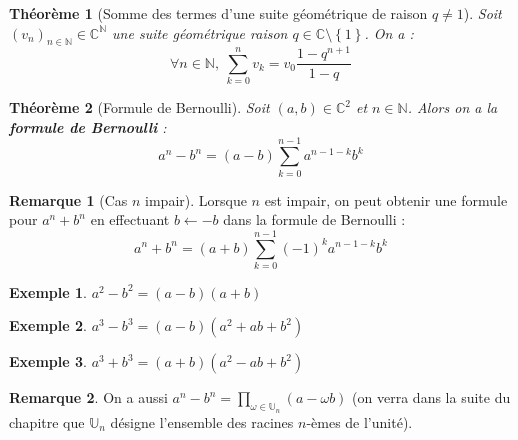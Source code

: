 \documentclass[french]{book}
\newcommand{\N}{\mathbb{N}}
\newcommand{\C}{\mathbb{C}}
\newcommand{\U}{\mathbb{U}}
\theoremstyle{plain}
\newtheorem{thm}{Théorème}[chapter]
\theoremstyle{definition}
\newtheorem{exa}{Exemple}[chapter]
\newtheorem{rmq}{Remarque}[chapter]
\theoremstyle{remark}
\begin{document}
\begin{thm}[Somme des termes d'une suite géométrique de raison $q\ne1$]
	Soit $(v_n)_{n\in\N}\in\C^\N$ une suite géométrique raison $q\in\C\setminus\left\{1\right\}$. On a : $$\forall n\in\N,\ \sum_{k=0}^{n}v_k=v_0\frac{1-q^{n+1}}{1-q}$$
\end{thm}
\begin{thm}[Formule de Bernoulli]
	Soit $(a,b)\in\C^2$ et $n\in\N$. Alors on a la \textbf{formule de Bernoulli} : $$a^n-b^n=(a-b)\sum_{k=0}^{n-1}a^{n-1-k}b^k$$
\end{thm}
\begin{rmq}[Cas $n$ impair]
	Lorsque $n$ est impair, on peut obtenir une formule pour $a^n+b^n$ en effectuant $b\leftarrow -b$ dans la formule de Bernoulli : $$a^n+b^n=(a+b)\sum_{k=0}^{n-1}(-1)^ka^{n-1-k}b^k$$
\end{rmq}
\begin{exa}
	$a^2-b^2=(a-b)(a+b)$
\end{exa}
\begin{exa}
	$a^3-b^3=(a-b)(a^2+ab+b^2)$
\end{exa}
\begin{exa}
	$a^3+b^3=(a+b)(a^2-ab+b^2)$
\end{exa}
\begin{rmq}
	On a aussi $a^n-b^n=\displaystyle\prod_{\omega\in\U_n}(a-\omega b)$ (on verra dans la suite du chapitre que $\U_n$ désigne l'ensemble des racines $n$-èmes de l'unité).
\end{rmq}
\end{document}
